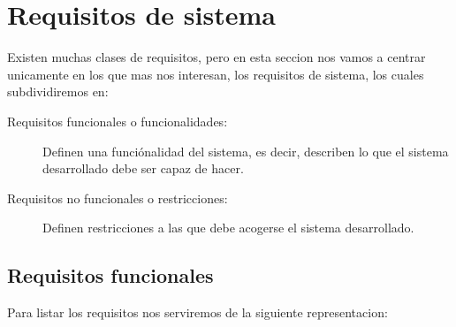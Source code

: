 \chapter{Requisitos de sistema}

    Existen muchas clases de requisitos, pero en esta seccion nos vamos a centrar unicamente en los que mas nos interesan, los requisitos de sistema, los cuales subdividiremos en:
    \begin{description}
        \item[Requisitos funcionales o funcionalidades:]
            Definen una funciónalidad del sistema, es decir, describen lo que el sistema desarrollado debe ser capaz de hacer.
        \item[Requisitos no funcionales o restricciones:]
            Definen restricciones a las que debe acogerse el sistema desarrollado.
    \end{description}
  

\section{Requisitos funcionales}
    Para listar los requisitos nos serviremos de la siguiente representacion:
    
    
    
    
    
    
    
    
    
    
    
    
    
    
    
    
    
    
    
    
    
    
    
    
    
    
    
    
    
    
    
     
